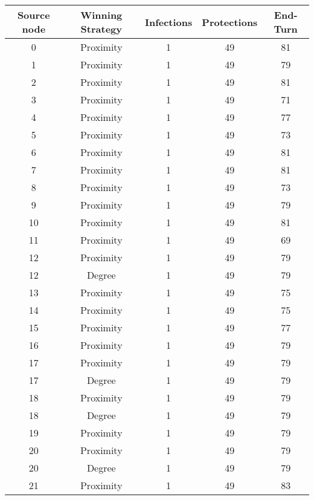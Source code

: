 \documentclass[results.tex]{subfiles}
\begin{document}
\begin{center}
  \begin{tabular}{| c || c | c | c | c |}
    \hline
    {\bfseries Source node} & {\bfseries Winning Strategy} & {\bfseries Infections} & {\bfseries Protections} & {\bfseries End-Turn} \\  %
    \hline\hline
    0 & Proximity & 1 & 49 & 81 \\ 
    \hline
    1 & Proximity & 1 & 49 & 79 \\ 
    \hline
    2 & Proximity & 1 & 49 & 81 \\ 
    \hline
    3 & Proximity & 1 & 49 & 71 \\ 
    \hline
    4 & Proximity & 1 & 49 & 77 \\ 
    \hline
    5 & Proximity & 1 & 49 & 73 \\ 
    \hline
    6 & Proximity & 1 & 49 & 81 \\ 
    \hline
    7 & Proximity & 1 & 49 & 81 \\ 
    \hline
    8 & Proximity & 1 & 49 & 73 \\ 
    \hline
    9 & Proximity & 1 & 49 & 79 \\ 
    \hline
    10 & Proximity & 1 & 49 & 81 \\ 
    \hline
    11 & Proximity & 1 & 49 & 69 \\ 
    \hline
    12 & Proximity & 1 & 49 & 79 \\ 
    \hline
    12 & Degree & 1 & 49 & 79 \\ 
    \hline
    13 & Proximity & 1 & 49 & 75 \\ 
    \hline
    14 & Proximity & 1 & 49 & 75 \\ 
    \hline
    15 & Proximity & 1 & 49 & 77 \\ 
    \hline
    16 & Proximity & 1 & 49 & 79 \\ 
    \hline
    17 & Proximity & 1 & 49 & 79 \\ 
    \hline
    17 & Degree & 1 & 49 & 79 \\ 
    \hline
    18 & Proximity & 1 & 49 & 79 \\ 
    \hline
    18 & Degree & 1 & 49 & 79 \\ 
    \hline
    19 & Proximity & 1 & 49 & 79 \\ 
    \hline
    20 & Proximity & 1 & 49 & 79 \\ 
    \hline
    20 & Degree & 1 & 49 & 79 \\ 
    \hline
    21 & Proximity & 1 & 49 & 83 \\ 

\end{tabular}
\end{center}
\end{document}
